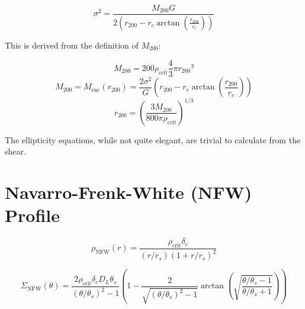 \documentclass[10pt]{article}
\begin{document}
\begin{equation}
\sigma^2 = \frac{M_{200} G}{2 \left( r_{200} - r_c \arctan{\left(\frac{r_{200}}{r_c}\right)} \right)}
\end{equation}

This is derived from the definition of $M_{200}$:

\begin{equation}
M_{200} = 200 \rho_\mathrm{crit} \frac{4}{3} \pi {r_{200}}^3
\end{equation}
\begin{equation}
M_{200} = M_\mathrm{enc}(r_{200}) = \frac{2 \sigma^2}{G} \left( r_{200} - r_c \arctan{\left(\frac{r_{200}}{r_c}\right)} \right)
\end{equation}
\begin{equation}
r_{200} = \left( \frac{3 M_{200}}{800 \pi \rho_\mathrm{crit}} \right)^{1/3}
\end{equation}

The ellipticity equations, while not quite elegant, are trivial to calculate from the shear.



\section{Navarro-Frenk-White (NFW) Profile}

\begin{equation}
\rho_\mathrm{NFW}(r) = \frac{\rho_\mathrm{crit} \delta_c}{(r/r_s)\left(1 + r/r_s\right)^2}
\end{equation}

%
%
%

\begin{equation}
\Sigma_\mathrm{NFW}(\theta) = \frac{2 \rho_\mathrm{crit} \delta_c D_L \theta_s}{(\theta/\theta_s)^2 - 1} \left(1 - \frac{2}{\sqrt{(\theta/\theta_s)^2 - 1}} \arctan\left(\sqrt{\frac{\theta/\theta_s - 1}{\theta/\theta_s + 1}} \right) \right)
\end{equation}
\end{document}
